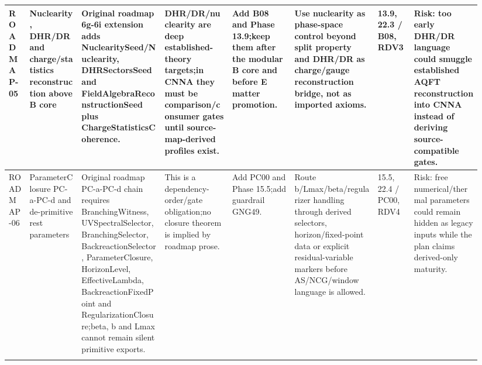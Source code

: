 \begin{longtable}{L{0.04\linewidth} L{0.105\linewidth} L{0.16\linewidth} L{0.13\linewidth} L{0.125\linewidth} L{0.165\linewidth} L{0.075\linewidth} L{0.135\linewidth}}
ROADMAP-05 & Nuclearity, DHR/\allowbreak{}DR and charge/\allowbreak{}statistics reconstruction above B core & Original roadmap 6g-6i extension adds NuclearitySeed/\allowbreak{}Nuclearity, DHRSectorsSeed and FieldAlgebraReconstructionSeed plus ChargeStatisticsCoherence. & DHR/\allowbreak{}DR/\allowbreak{}nuclearity are deep established-theory targets;\newline in CNNA they must be comparison/\allowbreak{}consumer gates until source-map-derived profiles exist. & Add B08 and Phase 13.9;\newline keep them after the modular B core and before E matter promotion. & Use nuclearity as phase-space control beyond split property and DHR/\allowbreak{}DR as charge/\allowbreak{}gauge reconstruction bridge, not as imported axioms. & 13.9, 22.3 /\allowbreak{} B08, RDV3 & Risk: too early DHR/\allowbreak{}DR language could smuggle established AQFT reconstruction into CNNA instead of deriving source-compatible gates.\\
\hline
\addlinespace[0.24em]
ROADMAP-06 & ParameterClosure PC-a-PC-d and de-primitive rest parameters & Original roadmap PC-a-PC-d chain requires BranchingWitness, UVSpectralSelector, BranchingSelector, BackreactionSelector, ParameterClosure, HorizonLevel, EffectiveLambda, BackreactionFixedPoint and RegularizationClosure;\newline beta, b and Lmax cannot remain silent primitive exports. & This is a dependency-order/\allowbreak{}gate obligation;\newline no closure theorem is implied by roadmap prose. & Add PC00 and Phase 15.5;\newline add guardrail GNG49. & Route b/\allowbreak{}Lmax/\allowbreak{}beta/\allowbreak{}regularizer handling through derived selectors, horizon/\allowbreak{}fixed-point data or explicit residual-variable markers before AS/\allowbreak{}NCG/\allowbreak{}window language is allowed. & 15.5, 22.4 /\allowbreak{} PC00, RDV4 & Risk: free numerical/\allowbreak{}thermal parameters could remain hidden as legacy inputs while the plan claims derived-only maturity.\\
\hline
\addlinespace[0.24em]

\end{longtable}
